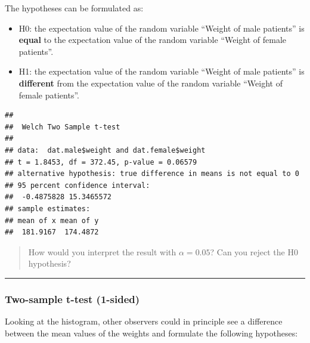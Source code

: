 \documentclass[
]{book}
\newenvironment{Shaded}{\begin{snugshade}}{\end{snugshade}}
\newcommand{\CommentTok}[1]{\textcolor[rgb]{0.56,0.35,0.01}{\textit{#1}}}
\newcommand{\FunctionTok}[1]{\textcolor[rgb]{0.13,0.29,0.53}{\textbf{#1}}}
\newcommand{\NormalTok}[1]{#1}
\newcommand{\SpecialCharTok}[1]{\textcolor[rgb]{0.81,0.36,0.00}{\textbf{#1}}}
\begin{document}
The hypotheses can be formulated as:

\begin{itemize}
\item
  H0: the expectation value of the random variable ``Weight of male patients'' is \textbf{equal} to the expectation value of the random variable ``Weight of female patients''.\\
\item
  H1: the expectation value of the random variable ``Weight of male patients'' is \textbf{different} from the expectation value of the random variable ``Weight of female patients''.
\end{itemize}

\begin{Shaded}
\end{Shaded}

\begin{verbatim}
## 
##  Welch Two Sample t-test
## 
## data:  dat.male$weight and dat.female$weight
## t = 1.8453, df = 372.45, p-value = 0.06579
## alternative hypothesis: true difference in means is not equal to 0
## 95 percent confidence interval:
##  -0.4875828 15.3465572
## sample estimates:
## mean of x mean of y 
##  181.9167  174.4872
\end{verbatim}

\begin{quote}
How would you interpret the result with \(\alpha=0.05\)?
Can you reject the H0 hypothesis?
\end{quote}

\begin{center}\rule{0.5\linewidth}{0.5pt}\end{center}

\hypertarget{two-sample-t-test-1-sided}{%
\subsubsection{Two-sample t-test (1-sided)}\label{two-sample-t-test-1-sided}}

Looking at the histogram, other observers could in principle see a difference between the mean values of the weights and formulate the following hypotheses:
\end{document}
